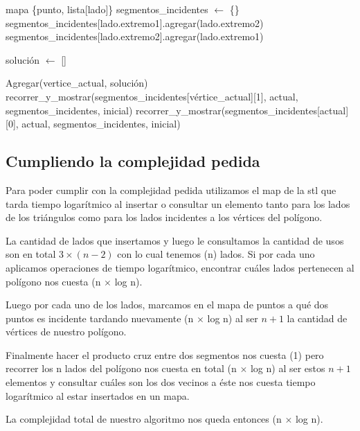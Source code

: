 \begin{algorithmic}

	\State mapa \{punto, lista[lado]\} segmentos_incidentes $\gets$ \{\}
		\State segmentos_incidentes[lado.extremo1].agregar(lado.extremo2)
		\State segmentos_incidentes[lado.extremo2].agregar(lado.extremo1)
	\EndFor 
\EndFunction
\end{algorithmic}


\begin{algorithmic}
\State solución $\gets$ []

	\State Agregar(vertice_actual, solución)
			\State recorrer_y_mostrar(segmentos_incidentes[vértice_actual][1], actual, segmentos_incidentes, inicial)
		\EndIf
	\Else
			\State recorrer_y_mostrar(segmentos_incidentes[actual][0], actual, segmentos_incidentes, inicial)
		\EndIf
	\EndIf
\EndFunction

\end{algorithmic}

\subsection{Cumpliendo la complejidad pedida}
Para poder cumplir con la complejidad pedida utilizamos el map de la stl que tarda tiempo logarítmico al insertar o consultar un elemento tanto para los lados de los triángulos como para los lados incidentes a los vértices del polígono.\newline

La cantidad de lados que insertamos y luego le consultamos la cantidad de usos son en total $3 \times (n-2)$ con lo cual tenemos \bigo(n) lados. Si por cada uno aplicamos operaciones de tiempo logarítmico, encontrar cuáles lados pertenecen al polígono nos cuesta \bigo(n $\times$ log n).\newline

Luego por cada uno de los lados, marcamos en el mapa de puntos a qué dos puntos es incidente tardando nuevamente \bigo(n $\times$ log n) al ser $n + 1$ la cantidad de vértices de nuestro polígono.\newline

Finalmente hacer el producto cruz entre dos segmentos nos cuesta \bigo(1) pero recorrer los n lados del polígono nos cuesta en total \bigo(n $\times$ log n) al ser estos $n+1$ elementos y consultar cuáles son los dos vecinos a éste nos cuesta tiempo logarítmico al estar insertados en un mapa.\newline

La complejidad total de nuestro algoritmo nos queda entonces \bigo(n $\times$ log n).\newline